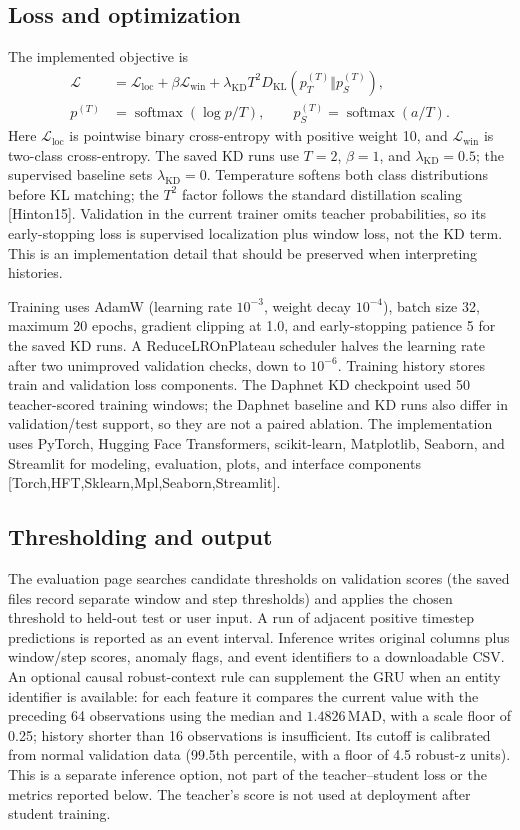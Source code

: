 \documentclass[twoside,english]{article}
\renewcommand{\cite}[1]{[#1]}
\begin{document}
\subsection{Loss and optimization}
The implemented objective is
\begin{align}
\mathcal{L} &= \mathcal{L}_{\mathrm{loc}} + \beta\mathcal{L}_{\mathrm{win}}
 + \lambda_{\mathrm{KD}} T^2 D_{\mathrm{KL}}(p_T^{(T)}\Vert p_S^{(T)}),\\
p^{(T)} &= \operatorname{softmax}(\log p/T), \qquad
p_S^{(T)}=\operatorname{softmax}(a/T).
\end{align}
Here $\mathcal{L}_{\mathrm{loc}}$ is pointwise binary cross-entropy with positive weight 10, and $\mathcal{L}_{\mathrm{win}}$ is two-class cross-entropy. The saved KD runs use $T=2$, $\beta=1$, and $\lambda_{\mathrm{KD}}=0.5$; the supervised baseline sets $\lambda_{\mathrm{KD}}=0$. Temperature softens both class distributions before KL matching; the $T^2$ factor follows the standard distillation scaling \cite{Hinton15}. Validation in the current trainer omits teacher probabilities, so its early-stopping loss is supervised localization plus window loss, not the KD term. This is an implementation detail that should be preserved when interpreting histories.

Training uses AdamW (learning rate $10^{-3}$, weight decay $10^{-4}$), batch size 32, maximum 20 epochs, gradient clipping at 1.0, and early-stopping patience 5 for the saved KD runs. A ReduceLROnPlateau scheduler halves the learning rate after two unimproved validation checks, down to $10^{-6}$. Training history stores train and validation loss components. The Daphnet KD checkpoint used 50 teacher-scored training windows; the Daphnet baseline and KD runs also differ in validation/test support, so they are not a paired ablation. The implementation uses PyTorch, Hugging Face Transformers, scikit-learn, Matplotlib, Seaborn, and Streamlit for modeling, evaluation, plots, and interface components \cite{Torch,HFT,Sklearn,Mpl,Seaborn,Streamlit}.

\subsection{Thresholding and output}
The evaluation page searches candidate thresholds on validation scores (the saved files record separate window and step thresholds) and applies the chosen threshold to held-out test or user input. A run of adjacent positive timestep predictions is reported as an event interval. Inference writes original columns plus window/step scores, anomaly flags, and event identifiers to a downloadable CSV. An optional causal robust-context rule can supplement the GRU when an entity identifier is available: for each feature it compares the current value with the preceding 64 observations using the median and $1.4826\,\mathrm{MAD}$, with a scale floor of 0.25; history shorter than 16 observations is insufficient. Its cutoff is calibrated from normal validation data (99.5th percentile, with a floor of 4.5 robust-z units). This is a separate inference option, not part of the teacher--student loss or the metrics reported below. The teacher's score is not used at deployment after student training.
\end{document}
